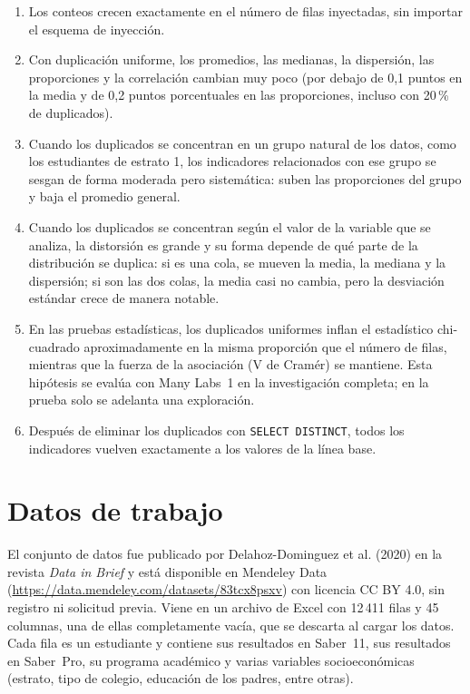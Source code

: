 \documentclass[11pt,openany,oneside,letterpaper]{book}
\begin{document}
\begin{enumerate}
 \item[\textbf{H1.}] Los conteos crecen exactamente en el número de filas inyectadas, sin importar el esquema de inyección.
 \item[\textbf{H2.}] Con duplicación uniforme, los promedios, las medianas, la dispersión, las proporciones y la correlación cambian muy poco (por debajo de 0,1 puntos en la media y de 0,2 puntos porcentuales en las proporciones, incluso con 20\,\% de duplicados).
 \item[\textbf{H3.}] Cuando los duplicados se concentran en un grupo natural de los datos, como los estudiantes de estrato 1, los indicadores relacionados con ese grupo se sesgan de forma moderada pero sistemática: suben las proporciones del grupo y baja el promedio general.
 \item[\textbf{H4.}] Cuando los duplicados se concentran según el valor de la variable que se analiza, la distorsión es grande y su forma depende de qué parte de la distribución se duplica: si es una cola, se mueven la media, la mediana y la dispersión; si son las dos colas, la media casi no cambia, pero la desviación estándar crece de manera notable.
 \item[\textbf{H5.}] En las pruebas estadísticas, los duplicados uniformes inflan el estadístico chi-cuadrado aproximadamente en la misma proporción que el número de filas, mientras que la fuerza de la asociación (V de Cramér) se mantiene. Esta hipótesis se evalúa con Many Labs~1 en la investigación completa; en la prueba solo se adelanta una exploración.
 \item[\textbf{H6.}] Después de eliminar los duplicados con \texttt{SELECT DISTINCT}, todos los indicadores vuelven exactamente a los valores de la línea base.
\end{enumerate}

\section{Datos de trabajo}

El conjunto de datos fue publicado por Delahoz-Dominguez et al. (2020) en la revista \emph{Data in Brief} y está disponible en Mendeley Data (\url{https://data.mendeley.com/datasets/83tcx8psxv}) con licencia CC BY 4.0, sin registro ni solicitud previa. Viene en un archivo de Excel con 12\,411 filas y 45 columnas, una de ellas completamente vacía, que se descarta al cargar los datos. Cada fila es un estudiante y contiene sus resultados en Saber~11, sus resultados en Saber~Pro, su programa académico y varias variables socioeconómicas (estrato, tipo de colegio, educación de los padres, entre otras).
\end{document}
